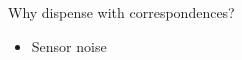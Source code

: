 \begin{frame}[noframenumbering]{Why dispense with correspondences?}

\begin{overlayarea}{\textwidth}{3cm}
\leavevmode
  \begin{itemize}
    \item Sensor noise
  \end{itemize}

\end{overlayarea}

\end{frame}
